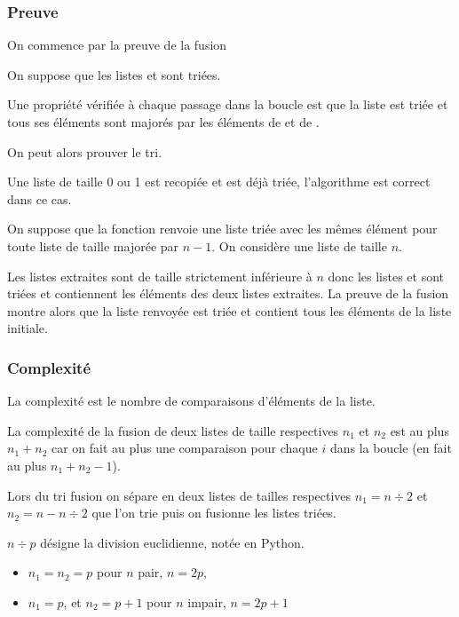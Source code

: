 \subsubsection{Preuve}
On commence par la preuve de la fusion

On suppose que les listes  et  sont triées.

Une propriété vérifiée à chaque passage dans la boucle  est que la liste  est triée et tous ses éléments sont majorés par les éléments de  et de .

On peut alors prouver le tri.

Une liste de taille 0 ou 1  est recopiée et est déjà triée, l'algorithme est correct dans ce cas.

On suppose que la fonction renvoie une liste triée avec les mêmes élément pour toute liste de taille majorée par $n-1$. On considère une liste de taille $n$.

Les listes extraites sont de taille strictement inférieure à $n$ donc les listes  et  sont triées et contiennent les éléments des deux listes extraites. La preuve de la fusion montre alors que la liste renvoyée est triée et contient tous les éléments de la liste initiale.
\subsubsection{Complexité}

La complexité est le nombre de comparaisons d'éléments de la liste.

La complexité de la fusion de deux listes de taille respectives $n_1$ et $n_2$ est au plus $n_1+n_2$ car on fait au plus une comparaison pour chaque $i$ dans la boucle (en fait au plus $n_1+n_2-1$).

Lors du tri fusion on sépare en deux listes de tailles respectives $n_1 = n\div 2$ et $n_2 = n-n\div 2$ que l'on trie puis on fusionne les listes triées. 

$n\div p$ désigne la division euclidienne, notée  en Python.

\begin{itemize}
    \item $n_1=n_2 = p$ pour $n$ pair, $n = 2p$,
    \item $n_1=p$, et $n_2 = p+1$ pour $n$ impair, $n = 2p+1$
\end{itemize}

